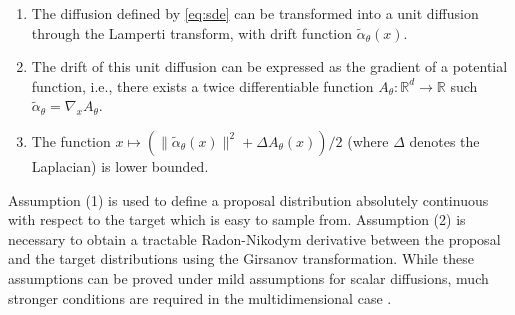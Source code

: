\documentclass{article}
\newcommand{\parvec}{\theta}
\newcommand{\rset}{\ensuremath{\mathbb{R}}}
\begin{document}
\begin{enumerate}
\item The diffusion defined by \eqref{eq:sde} can be transformed into a unit diffusion through the Lamperti transform, with drift function $\tilde{\alpha}_\parvec(x)$.
\item The drift of this unit diffusion can be expressed as the gradient of a potential function, i.e., there exists a twice differentiable function $A_{\parvec}:\mathbb{R}^d \to \rset$ such $\tilde{\alpha}_{\parvec} = \nabla_x A_{\parvec}$.
\item The function $x\mapsto (\|\tilde{\alpha}_{\parvec}(x)\|^2 + \Delta A_{\parvec}(x))/2$ (where $\Delta$ denotes the Laplacian) is lower bounded.
\end{enumerate}

Assumption (1)
 is used to define a proposal distribution absolutely continuous with respect to the target which is easy to sample from. 
Assumption (2)
 is necessary to obtain a tractable Radon-Nikodym derivative between the proposal and the target distributions using the Girsanov transformation. 
 While these assumptions can be proved under mild assumptions for scalar diffusions, much stronger conditions are required in the multidimensional case \cite{ait-sahalia2008closed}. 
\end{document}
